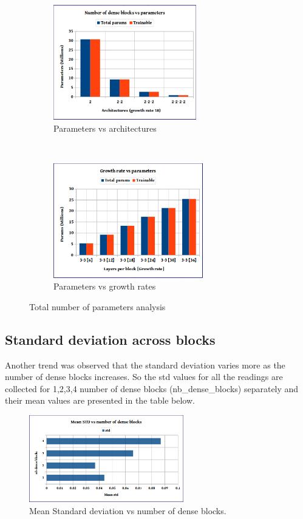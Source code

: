 \begin{figure}
    \centering
    \begin{subfigure}[b]{0.4\textwidth}
        \includegraphics[height=5cm]{images/densenet/Denseblocks_vs_parameters}
        \caption{Parameters vs architectures}
        \label{fig:Denseblocks_vs_parameters}
    \end{subfigure}
    ~ %
    \begin{subfigure}[b]{0.4\textwidth}
        \includegraphics[height=5cm]{images/densenet/growthrate_vs_parameters}
        \caption{Parameters vs growth rates}
        \label{fig:growthrate_vs_parameters}
    \end{subfigure}    
    \caption{Total number of parameters analysis}\label{fig:total_parameters_densenet}
\end{figure}


\subsection{Standard deviation across blocks}
Another trend was observed that the standard deviation varies more as the number of dense blocks increases. 
So the std values for all the readings are collected for 1,2,3,4 number of dense blocks (nb\_dense\_blocks) separately and their mean values are presented in the table below.

\begin{figure}[ht]
\centering
\includegraphics[width=0.6\textwidth]{images/densenet/std_vs_denseblocks.png}
\caption{\label{fig:std_vs_denseblocks} Mean Standard deviation vs number of dense blocks.}
\end{figure}

